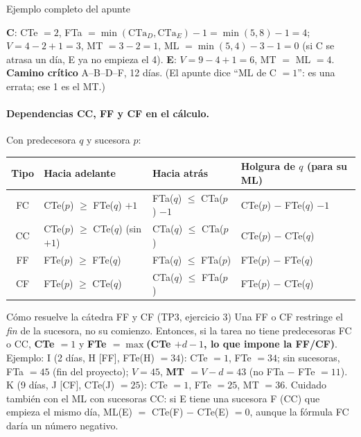 \documentclass[11pt,a4paper]{article}
\newcommand{\tnode}[9][tarea]{\node[#1,
  label={[temp,anchor=south west,inner sep=1pt]north west:#6},
  label={[temp,anchor=south east,inner sep=1pt]north east:#7},
  label={[tard,anchor=north west,inner sep=1pt]south west:#8},
  label={[tard,anchor=north east,inner sep=1pt]south east:#9}] (#2) at (#3) {\textbf{#4}\hspace{5mm}#5};}
\begin{document}
\begin{ejemplo}{Ejemplo completo del apunte}
\centering
{}
\raggedright\par\smallskip
\textbf{C}: CTe $=2$, FTa $= \min(\text{CTa}_D, \text{CTa}_E) - 1 = \min(5, 8) - 1 = 4$; $V = 4 - 2 + 1 = 3$,
MT $= 3 - 2 = 1$, ML $= \min(5, 4) - 3 - 1 = 0$ (si C se atrasa un día, E ya no empieza el 4). \textbf{E}: $V =
9 - 4 + 1 = 6$, MT $=$ ML $= 4$. \textbf{Camino crítico} A--B--D--F, 12 días. (El apunte dice ``ML de C $=1$'':
es una errata; ese 1 es el MT.)
\end{ejemplo}

\paragraph{Dependencias CC, FF y CF en el cálculo.} Con predecesora $q$ y sucesora $p$:
\begin{center}\small
\begin{tabularx}{\textwidth}{@{}c X X X@{}}
\toprule
\textbf{Tipo} & \textbf{Hacia adelante} & \textbf{Hacia atrás} & \textbf{Holgura de $q$ (para su ML)}\\
\midrule
FC & CTe($p$) $\ge$ FTe($q$) $+1$ & FTa($q$) $\le$ CTa($p$) $-1$ & CTe($p$) $-$ FTe($q$) $-1$\\
CC & CTe($p$) $\ge$ CTe($q$) (sin $+1$) & CTa($q$) $\le$ CTa($p$) & CTe($p$) $-$ CTe($q$)\\
FF & FTe($p$) $\ge$ FTe($q$) & FTa($q$) $\le$ FTa($p$) & FTe($p$) $-$ FTe($q$)\\
CF & FTe($p$) $\ge$ CTe($q$) & CTa($q$) $\le$ FTa($p$) & FTe($p$) $-$ CTe($q$)\\
\bottomrule
\end{tabularx}
\end{center}
\begin{aviso}{Cómo resuelve la cátedra FF y CF (TP3, ejercicio 3)}
Una FF o CF restringe el \emph{fin} de la sucesora, no su comienzo. Entonces, si la tarea no tiene predecesoras
FC o CC, \textbf{CTe $= 1$} y \textbf{FTe $= \max$(CTe $+ d - 1$, lo que impone la FF/CF)}. Ejemplo: I (2 días,
H [FF], FTe(H) $= 34$): CTe $= 1$, FTe $= 34$; sin sucesoras, FTa $= 45$ (fin del proyecto); $V = 45$,
\textbf{MT $= V - d = 43$} (no FTa $-$ FTe $= 11$). K (9 días, J [CF], CTe(J) $= 25$): CTe $= 1$, FTe $= 25$,
MT $= 36$. Cuidado también con el ML con sucesoras CC: si E tiene una sucesora F (CC) que empieza el mismo día,
ML(E) $=$ CTe(F) $-$ CTe(E) $= 0$, aunque la fórmula FC daría un número negativo.
\end{aviso}
\end{document}
